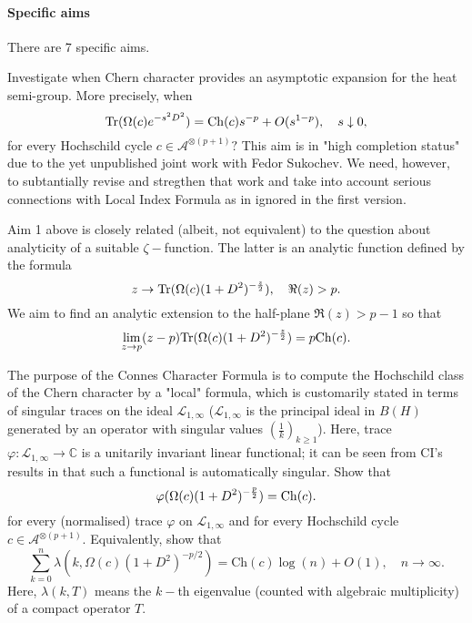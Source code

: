 \documentclass{article}
\begin{document}
\paragraph*{Specific aims} There are 7 specific aims.


 Investigate when Chern character provides an asymptotic expansion for the heat semi-group. More precisely, when 
\begin{equation}\label{heat eq}
{\rm Tr}(\Omega(c)e^{-s^2D^2})={\rm Ch}(c)s^{-p}+O(s^{1-p}),\quad s\downarrow0,
\end{equation}
for every Hochschild cycle $c\in\mathcal{A}^{\otimes (p+1)}?$ This aim is in "high completion status" due to the yet unpublished joint work with Fedor Sukochev. We need, however, to subtantially revise and stregthen that work and take into account serious connections with Local Index Formula as in \cite{ConnesMoscovici, CGRS} ignored in the first version.

 Aim 1 above is closely related (albeit, not equivalent) to the question about analyticity of a suitable $\zeta-$function. The latter is an analytic function defined by the formula
$$z\to {\rm Tr}(\Omega(c)(1+D^2)^{-\frac{z}{2}}),\quad \Re(z)>p.$$
We aim to find an analytic extension to the half-plane $\Re(z)>p-1$ so that
$$\lim_{z\to p}(z-p){\rm Tr}(\Omega(c)(1+D^2)^{-\frac{z}{2}})=p{\rm Ch}(c).$$

 The purpose of the Connes Character Formula is to compute the Hochschild class of the Chern character by a "local" formula, which is customarily  stated in terms of singular traces on the ideal $\mathcal{L}_{1,\infty}$ ($\mathcal{L}_{1,\infty}$ is the principal ideal in $B(H)$ generated by an operator with singular values $(\frac1k)_{k\geq1}$). Here, trace $\varphi:\mathcal{L}_{1,\infty}\to\mathbb{C}$ is a unitarily invariant linear functional; it can be seen from CI's results in \cite{book} that such a functional is automatically singular. Show that
\begin{equation}\label{super main eq}
\varphi(\Omega(c)(1+D^2)^{-\frac{p}{2}})={\rm Ch}(c).
\end{equation}
for every (normalised) trace $\varphi$ on $\mathcal{L}_{1,\infty}$ and for every Hochschild cycle $c\in\mathcal{A}^{\otimes (p+1)}.$ Equivalently, show that
$$\sum_{k=0}^n \lambda(k,\Omega(c)(1+D^2)^{-p/2}) = \mathrm{Ch}(c)\log(n)+O(1),\quad n\to\infty.$$
Here, $\lambda(k,T)$ means the $k-$th eigenvalue (counted with algebraic multiplicity) of a compact operator $T.$
\end{document}
